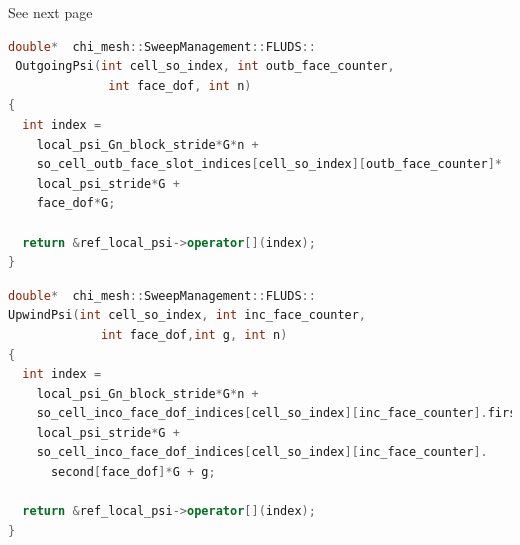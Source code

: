 \documentclass[11pt,letterpaper,titlepage]{article}
\numberwithin{equation}{section}
\begin{document}
\vspace{2cm}
See next page

\newpage
\begin{lstlisting}[language=c++]
double*  chi_mesh::SweepManagement::FLUDS::
 OutgoingPsi(int cell_so_index, int outb_face_counter,
              int face_dof, int n)
{
  int index =
    local_psi_Gn_block_stride*G*n +
    so_cell_outb_face_slot_indices[cell_so_index][outb_face_counter]*
    local_psi_stride*G +
    face_dof*G;

  return &ref_local_psi->operator[](index);
}
\end{lstlisting}

\begin{lstlisting}[language=c++]
double*  chi_mesh::SweepManagement::FLUDS::
UpwindPsi(int cell_so_index, int inc_face_counter,
             int face_dof,int g, int n)
{
  int index =
    local_psi_Gn_block_stride*G*n +
    so_cell_inco_face_dof_indices[cell_so_index][inc_face_counter].first*
    local_psi_stride*G +
    so_cell_inco_face_dof_indices[cell_so_index][inc_face_counter].
      second[face_dof]*G + g;

  return &ref_local_psi->operator[](index);
}
\end{lstlisting}
\end{document}
